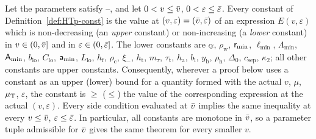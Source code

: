 \begin{lemma}\label{lem:HTp-M}
Let the parameters satisfy --, and let $0<v\le\bar v$, $0<\varepsilon\le\bar\varepsilon$. Every constant of
Definition~\ref{def:HTp-const} is the value at $(v,\varepsilon)=(\bar v,\bar\varepsilon)$ of an expression $E(v,\varepsilon)$ which is
non-decreasing (an \emph{upper} constant) or non-increasing (a \emph{lower} constant) in $v\in(0,\bar v]$ and in $\varepsilon\in(0,\bar\varepsilon]$.
The lower constants are $\underline\alpha$, $\rho_{\mathrm w}$, $\mathsf r_{\min}$, $\ell_{\min}$, $\Lambda_{\min}$, $\mathsf A_{\min}$,
$b_{\mathrm{lo}}$, $C_{\mathrm{lo}}$, $\mathsf a_{\min}$, $L_{\mathrm{lo}}$, $h_{\mathrm f}$, $\rho_{\mathrm c}$, $\xi_-$, $h_{\mathrm t}$,
$m_\tau$, $\tau_{\mathrm t}$, $h_{\mathrm a}$, $b_{\mathrm l}$, $y_{\mathrm b}$, $\rho_{\mathrm h}$, $\Delta_0$, $c_{\mathrm{sep}}$, $\kappa_2$; all
other constants are upper constants. Consequently, wherever a proof below uses a constant as an upper (lower) bound for a quantity
formed with the actual $v$, $\mu$, $\mu_{\mathrm T}$, $\varepsilon$, the constant is $\ge$ ($\le$) the value of the corresponding expression at the
actual $(v,\varepsilon)$. Every side condition evaluated at $\bar v$ implies the same inequality at every $v\le\bar v$, $\varepsilon\le\bar\varepsilon$.
In particular, all constants are monotone in $\bar v$, so a parameter tuple admissible for $\bar v$ gives the same theorem for every
smaller $v$.
\end{lemma}
